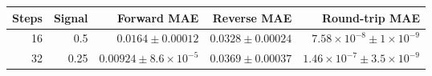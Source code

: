\begin{tabular}{rrrrr}
\toprule
Steps & Signal & Forward MAE & Reverse MAE & Round-trip MAE \\
\midrule
16 & 0.5 & $0.0164\pm0.00012$ & $0.0328\pm0.00024$ & $7.58\times10^{-8}\pm1\times10^{-9}$ \\
32 & 0.25 & $0.00924\pm8.6\times10^{-5}$ & $0.0369\pm0.00037$ & $1.46\times10^{-7}\pm3.5\times10^{-9}$ \\
\bottomrule
\end{tabular}
